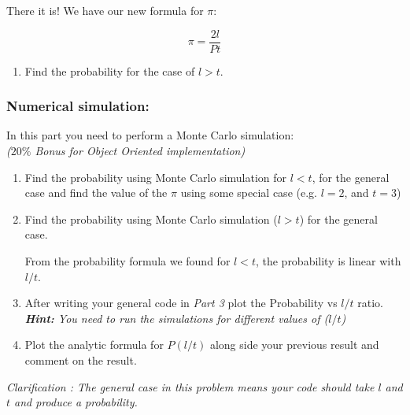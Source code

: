 \documentclass[12pt,letterpaper]{article}
\begin{document}
There it is! We have our new formula for $\pi$:

\begin{equation*}
\pi = \frac{2l}{Pt}
\end{equation*}

\begin{enumerate}
\item Find the probability for the case of $l>t$.
\end{enumerate}

\subsubsection*{Numerical simulation:} 
In this part you need to perform a Monte Carlo simulation: \\
\textit{($20\%$ Bonus for Object Oriented implementation)}

\begin{enumerate}[resume]
\item {Find the probability using Monte Carlo simulation for $l<t$, for the general case and find the value of the $\pi$ using some special case (e.g. $l = 2$, and $t = 3$)}  

\item Find the probability using Monte Carlo simulation ($l>t$) for the general case. 


From the probability formula we found for $l<t$, the probability is linear with $l/t$.

\item After writing your general code in \textit{Part 3} plot the Probability vs $l/t$ ratio. \\ 
\textit{\textbf{Hint:} You need to run the simulations for different values of ($l/t$)}


\item Plot the analytic formula for $P(l/t)$ along side your previous result and comment on the result. 
\end{enumerate}

\textit{Clarification : The general case  in this problem means your code should take $l$ and $t$ and produce a probability.}
\end{document}
